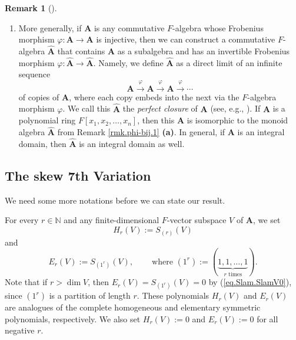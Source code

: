\documentclass[numbers=enddot,12pt,final,onecolumn,notitlepage]{scrartcl}%
\numberwithin{exer}{section}
\theoremstyle{definition}
\newtheorem{remk}[theo]{Remark}
\newenvironment{remark}[1][]
{\begin{remk}[#1]\begin{leftbar}}
{\end{leftbar}\end{remk}}
\theoremstyle{plainsl}
\begin{document}
\begin{remark}
\begin{enumerate}
\item[\textbf{(b)}] More generally, if $\mathbf{A}$ is any commutative
$F$-algebra whose Frobenius morphism $\varphi:\mathbf{A}\rightarrow\mathbf{A}$
is injective, then we can construct a commutative $F$-algebra
$\widehat{\mathbf{A}}$ that contains $\mathbf{A}$ as a subalgebra and has an
invertible Frobenius morphism $\varphi:\widehat{\mathbf{A}}\rightarrow
\widehat{\mathbf{A}}$. Namely, we define $\widehat{\mathbf{A}}$ as a direct
limit of an infinite sequence
\[
\mathbf{A}\overset{\varphi}{\longrightarrow}\mathbf{A}\overset{\varphi
}{\longrightarrow}\mathbf{A}\overset{\varphi}{\longrightarrow}\cdots
\]
of copies of $\mathbf{A}$, where each copy embeds into the next via the
$F$-algebra morphism $\varphi$. We call this $\widehat{\mathbf{A}}$ the
\emph{perfect closure} of $\mathbf{A}$ (see, e.g., \cite[Proposition
1.4]{Leptie22}). If $\mathbf{A}$ is a polynomial ring $F\left[  x_{1}%
,x_{2},\ldots,x_{n}\right]  $, then this $\widehat{\mathbf{A}}$ is isomorphic
to the monoid algebra $\widehat{\mathbf{A}}$ from Remark \ref{rmk.phi-bij.1}
\textbf{(a)}. In general, if $\mathbf{A}$ is an integral domain, then
$\widehat{\mathbf{A}}$ is an integral domain as well.
\end{enumerate}
\end{remark}

\subsection{The skew 7th Variation}

We need some more notations before we can state our result.

For every $r\in\mathbb{N}$ and any finite-dimensional $F$-vector subspace $V$
of $\mathbf{A}$, we set%
\[
H_{r}\left(  V\right)  :=S_{\left(  r\right)  }\left(  V\right)
\]
and%
\[
E_{r}\left(  V\right)  :=S_{\left(  1^{r}\right)  }\left(  V\right)
,\ \ \ \ \ \ \ \ \ \ \text{where }\left(  1^{r}\right)  :=\left(
\underbrace{1,1,\ldots,1}_{r\text{ times}}\right)  .
\]
Note that if $r>\dim V$, then $E_{r}\left(  V\right)  =S_{\left(
1^{r}\right)  }\left(  V\right)  =0$ by (\ref{eq.Slam.SlamV0}), since $\left(
1^{r}\right)  $ is a partition of length $r$. These polynomials $H_{r}\left(
V\right)  $ and $E_{r}\left(  V\right)  $ are analogues of the complete
homogeneous and elementary symmetric polynomials, respectively. We also set
$H_{r}\left(  V\right)  :=0$ and $E_{r}\left(  V\right)  :=0$ for all negative
$r$.
\end{document}
